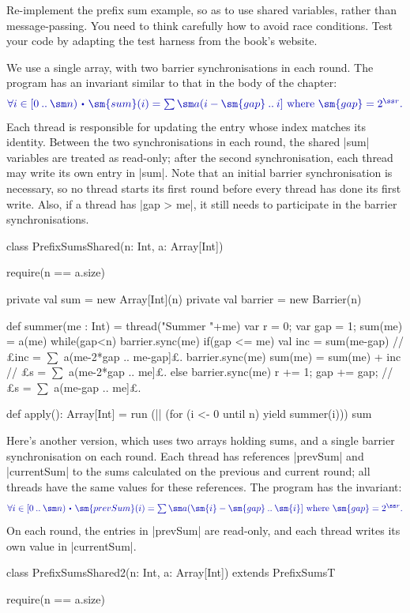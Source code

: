 \begin{question}
\label{ex:prefix-sums-shared}
Re-implement the prefix sum example, so as to use shared variables, rather
than message-passing.  You need to think carefully how to avoid race
conditions.  
%
Test your code by adapting the test harness from the book's website.
\end{question}


\begin{answerI}
We use a single array, with two barrier synchronisations in each round.  The
program has an invariant similar to that in the body of the chapter:
\[\mstyle
\forall i \in \interval{0}{\sm n} \spot
  \sm{sum}(i) = \textstyle\sum \sm a(i-\sm{gap} \upto i]
   \mbox{ where } \sm{gap} = 2^{\ss r} .
\]
Each thread is responsible for updating the entry whose index matches its
identity.  Between the two synchronisations in each round, the shared |sum|
variables are treated as read-only; after the second synchronisation, each
thread may write its own entry in |sum|.  Note that an initial barrier
synchronisation is necessary, so no thread starts its first round before every
thread has done its first write.  Also, if a thread has |gap > me|, it still
needs to participate in the barrier synchronisations.
%
\begin{scala}
class PrefixSumsShared(n: Int, a: Array[Int]){
  require(n == a.size)

  private val sum = new Array[Int](n) 
  private val barrier = new Barrier(n)

  def summer(me : Int) = thread("Summer "+me){    
    var r = 0; var gap = 1; sum(me) = a(me)
    while(gap<n){ 
      barrier.sync(me)
      if(gap <= me){                
        val inc = sum(me-gap)    // £inc = $\sum$ a(me-2*gap .. me-gap]£.
        barrier.sync(me)
        sum(me) = sum(me) + inc  // £s = $\sum$ a(me-2*gap .. me]£.
      }
      else barrier.sync(me)
      r += 1; gap += gap;        // £s = $\sum$ a(me-gap .. me]£.
    }
  }

  def apply(): Array[Int] = {
    run (|| (for (i <- 0 until n) yield summer(i)))
    sum
  }
}
\end{scala}


Here's another version, which uses two arrays holding sums, and a single
barrier synchronisation on each round.  Each thread has references |prevSum|
and |currentSum| to the sums calculated on the previous and current round; all
threads have the same values for these references.  The program has the
invariant: 
\[\mstyle
\forall i \in \interval{0}{\sm n} \spot
  \sm{prevSum}(i) = \textstyle\sum \sm a(\sm{i}-\sm{gap} \upto \sm{i}]
   \mbox{ where } \sm{gap} = 2^{\ss r} .
\]
On each round, the entries in |prevSum| are read-only, and each thread writes
its own value in |currentSum|.
%
\begin{scala}
class PrefixSumsShared2(n: Int, a: Array[Int]) extends PrefixSumsT{
  require(n == a.size)

}
\end{scala}
\end{answerI}
